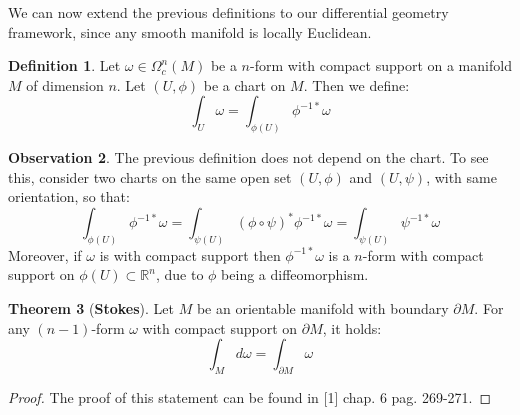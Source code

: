 \documentclass[12pt,a4paper]{report}
\theoremstyle{definition}
\newtheorem{Def}{Definition}[chapter]
\theoremstyle{Theorem}
\newtheorem{Theo}[Def]{Theorem}
\theoremstyle{definition}
\theoremstyle{definition}
\newtheorem{Obs}[Def]{Observation}
\begin{document}
	We can now extend the previous definitions to our differential geometry framework, since any smooth manifold is locally Euclidean.
	\begin{Def}
		Let $\omega\in\Omega^n_c(M)$ be a $n$-form with compact support on a manifold $M$ of dimension $n$. Let $(U,\phi)$ be a chart on $M$. Then we define:
		$$\int_U\omega=\int_{\phi(U)}\phi^{-1*}\omega$$
	\end{Def}
	\begin{Obs}
		The previous definition does not depend on the chart. To see this, consider two charts on the same open set $(U,\phi)$ and $(U,\psi)$, with same orientation, so that:
		$$\int_{\phi(U)}\phi^{-1*}\omega=\int_{\psi(U)}(\phi\circ\psi)^*\phi^{-1*}\omega=\int_{\psi(U)}\psi^{-1*}\omega$$
		Moreover, if $\omega$ is with compact support then $\phi^{-1*}\omega$ is a $n$-form with compact support on $\phi(U)\subset\mathbb{R}^n$, due to $\phi$ being a diffeomorphism. 
	\end{Obs}
	\begin{Theo}[\textbf{Stokes}]\label{Stokes}
		Let $M$ be an orientable manifold with boundary $\partial M$. For any $(n-1)$-form $\omega$ with compact support on $\partial M$, it holds:
		$$\int_M d\omega=\int_{\partial M}\omega$$ 
	\end{Theo}
	\begin{proof}
		The proof of this statement can be found in [1] chap. 6 pag. 269-271.
	\end{proof}
\end{document}
